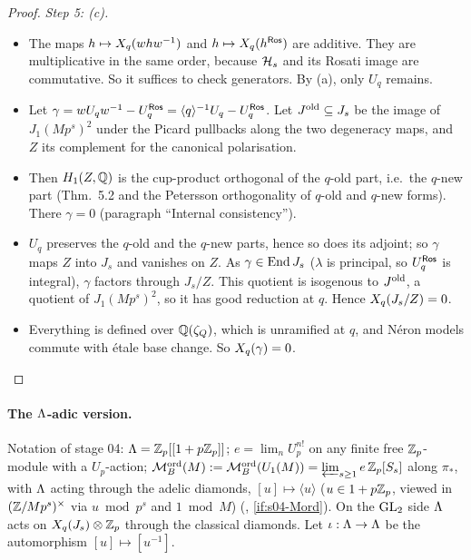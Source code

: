 \begin{proof}
\emph{Step 5: (c).}
\begin{itemize}
\item The maps $h\mapsto X_q(whw^{-1})$ and $h\mapsto X_q(h^{\mathsf{Ros}})$ are additive. They are multiplicative in the same order, because $\mathcal{H}_s$ and its Rosati image are commutative. So it suffices to
  check generators. By (a), only $U_q$ remains.
\item Let $\gamma=w U_qw^{-1}-U_q^{\mathsf{Ros}}=\langle q\rangle^{-1}U_q-U_q^{\mathsf{Ros}}$. Let $J^{\rm old}\subseteq J_s$ be the image of $J_1(Mp^s)^2$ under the Picard pullbacks along the two
  degeneracy maps, and $Z$ its complement for the canonical polarisation.
\item Then $H_1(Z,\mathbb{Q})$ is the cup-product orthogonal of the $q$-old part, i.e.\ the $q$-new part (Thm.~5.2 and the Petersson orthogonality of $q$-old and $q$-new forms).
  There $\gamma=0$ (paragraph ``Internal consistency'').
\item $U_q$ preserves the $q$-old and the $q$-new parts, hence so does its adjoint; so $\gamma$ maps $Z$ into $J_s$ and vanishes on $Z$.
  As $\gamma\in\operatorname{End} J_s$ ($\lambda$ is principal, so $U_q^{\mathsf{Ros}}$ is integral), $\gamma$ factors through $J_s/Z$. This quotient is isogenous to $J^{\rm old}$, a quotient of $J_1(Mp^s)^2$, so it has good reduction at $q$.
  Hence $X_q(J_s/Z)=0$.
\item Everything is defined over $\mathbb{Q}(\zeta_Q)$, which is unramified at $q$, and Néron models commute with étale base change. So $X_q(\gamma)=0$.
\end{itemize}
\end{proof}

\paragraph{The $\Lambda$-adic version.}
Notation of stage 04: $\Lambda=\mathbb{Z}_p[[1+p\mathbb{Z}_p]]$; $e=\lim_nU_p^{n!}$ on any finite free $\mathbb{Z}_p$-module with a $U_p$-action;
$\mathcal{M}^{\mathrm{ord}}_B(M):=\mathcal{M}^{\mathrm{ord}}_B(U_1(M))=\varprojlim_{s\ge1}e\,\mathbb{Z}_p[S_s]$ along $\pi_*$, with $\Lambda$ acting through the adelic diamonds, $[u]\mapsto\langle u\rangle$
($u\in1+p\mathbb{Z}_p$, viewed in $(\mathbb{Z}/Mp^s)^\times$ via $u\bmod p^s$ and $1\bmod M$) (, \ref{if:s04-Mord}). On the $\mathrm{GL}_2$ side
$\Lambda$ acts on $X_q(J_s)\otimes\mathbb{Z}_p$ through the classical diamonds. Let $\iota:\Lambda\to\Lambda$ be the automorphism $[u]\mapsto[u^{-1}]$.

